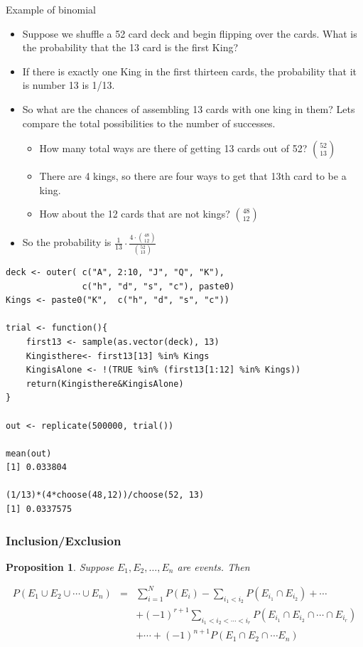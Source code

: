 \documentclass[handout]{beamer}
\newtheorem{prop}{Proposition}
\numberwithin{equation}{section}
\begin{document}
\begin{frame}{Example of binomial}
\begin{itemize}
\item Suppose we shuffle a 52 card deck and begin flipping over the cards.  What is the probability that the 13 card is the first King?\pause
\item If there is exactly one King in the first thirteen cards, the probability that it is number 13 is 1/13. \pause
\item So what are the chances of assembling 13 cards with one king in them?  Lets compare the total possibilities to the number of successes.\pause 
\begin{itemize}
\item How many total ways are there of getting 13 cards out of 52? \pause ${52\choose 13}$\pause
\item There are 4 kings, so there are four ways to get that 13th card to be a king. \pause
\item How about the 12 cards that are not kings?  \pause  ${48\choose 12}$
\end{itemize}
\item \pause So the probability is $\frac{1}{13}\cdot \frac{4\cdot{48\choose 12}}{{52\choose13}}$
\end{itemize}

\end{frame}

\begin{frame}[fragile]
\begin{verbatim}
deck <- outer( c("A", 2:10, "J", "Q", "K"), 
		       c("h", "d", "s", "c"), paste0)
Kings <- paste0("K",  c("h", "d", "s", "c"))

trial <- function(){
	first13 <- sample(as.vector(deck), 13)
	Kingisthere<- first13[13] %in% Kings 
	KingisAlone <- !(TRUE %in% (first13[1:12] %in% Kings))
	return(Kingisthere&KingisAlone)
}

out <- replicate(500000, trial())

mean(out)
[1] 0.033804

(1/13)*(4*choose(48,12))/choose(52, 13)
[1] 0.0337575
\end{verbatim}
\end{frame}


\begin{frame}
\frametitle{Inclusion/Exclusion}

\begin{prop} 
Suppose $E_{1}, E_{2}, \hdots, E_{n}$ are events.  Then 

\begin{eqnarray}
P(E_{1} \cup E_{2} \cup \cdots \cup E_{n} ) & = & \sum_{i=1}^{N} P(E_{i} ) - \sum_{i_{1} <i_{2} } P(E_{i_{1}} \cap E_{i_{2} } )+ \cdots \nonumber \\
& & + (-1)^{r+ 1} \sum_{i_{1}<i_{2} < \cdots< i_{r} } P(E_{i_{1}} \cap E_{i_{2}}\cap \cdots \cap E_{i_{r}} ) \nonumber \\
& & + \cdots + (-1)^{n+1} P(E_{1} \cap E_{2} \cap \cdots E_{n} ) \nonumber 
\end{eqnarray}
\end{prop}

\end{frame}
\end{document}
